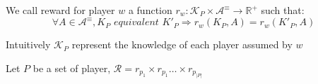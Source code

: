 \begin{mydef}
	We call reward for player $w$ a function $r_w : \mathcal{K}_P \times \mathcal{A}^\equiv \rightarrow \mathbb{R}^+$ 
	such that: $$ \forall A \in \mathcal{A}^\equiv, K_P \textit{ equivalent } K'_P \Rightarrow r_w(K_P,A) = r_w(K'_P,A) $$
\end{mydef}
Intuitively $\mathcal{K}_P$ represent the knowledge of each player assumed by $w$

\begin{mydef}
	Let $P$ be a set of player, $\mathcal{R} = r_{p_1} \times r_{p_1} \ldots \times r_{p_{|P|}}$
\end{mydef}
